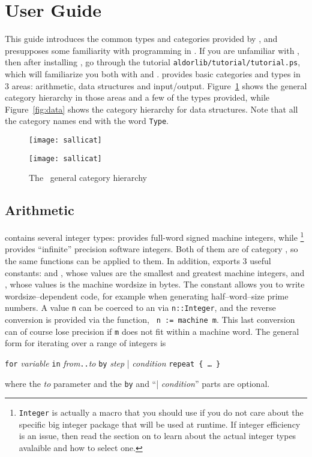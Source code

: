 \section{User Guide}

This guide introduces the common types and categories provided by \libaldor,
and presupposes some familiarity with programming in \aldor.
If you are unfamiliar with \aldor, then after installing \libaldor, go
through the tutorial
{\tt aldorlib/tutorial/tutorial.ps}, which will familiarize you both with
\aldor and \libaldor.
\libaldor{} provides basic categories and types in 3 areas:
arithmetic, data structures and input/output. Figure~\ref{fig:cats} shows the
general category hierarchy in those areas and a few of the types provided,
while Figure~\ref{fig:data} shows the category hierarchy for
data structures.
Note that all the category names end with the word {\tt Type}.

\begin{figure}[htb!]
\begin{latexonly}
\texttt{[image: sallicat]}
\end{latexonly}
\begin{htmlonly}
\texttt{[image: sallicat]}
\end{htmlonly}
\caption{The \libaldor{}~general category hierarchy}
\label{fig:cats}
\end{figure}

\subsection{Arithmetic}
\libaldor{} contains several integer types:
 provides full-word signed machine integers,
while \Integer{}
\footnote{{\tt Integer} is actually a macro that you should
use if you do not care about the specific big integer package that
will be used at runtime. If integer efficiency is an issue, then read
the section on  to learn about the actual
integer types avalaible and how to select one.}
provides ``infinite'' precision software integers.
Both of them are of category ,
so the same functions can be applied to them.
In addition,  exports 3 useful
constants: 
and , whose values are the smallest and
greatest machine integers,
and , whose values is the
machine wordsize in bytes.
The  constant allows you to write
wordsize--dependent code, for example when generating half--word--size prime
numbers. A  value {\tt n}
can be coerced to an \Integer{} via {\tt n::Integer}, and the reverse
conversion is provided via the  function,
\ie~{\tt n := machine m}. This last conversion can
of course lose precision if {\tt m} does not fit within a machine word.
The general form for iterating over a range of integers is\\
\centerline{ {\tt for} {\em variable} {\tt in} {\em from}{\tt..}{\em to}
{\tt by} {\em step} | {\em condition} {\tt repeat \{ \dots~\}} }
where the {\em to} parameter and the {\tt by} and ``| {\em condition}''
parts are optional.

